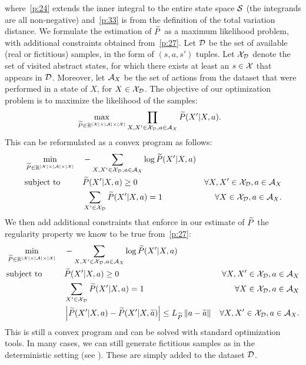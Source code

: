 where~\eqref{p:24} extends the inner integral to the entire state space $\mathcal{S}$ (the integrands are all non-negative) and~\eqref{p:33} is from the definition of the total variation distance.
We formulate the estimation of $\widetilde{P}$ as a maximum likelihood problem, with additional constraints obtained from~\eqref{p:27}.
Let $\mathcal{D}$ be the set of available (real or fictitious) samples, in the form of $(s,a,s')$ tuples. Let $\mathcal{X}_{\mathcal{D}}$ denote the set of visited abstract states, \ie for which there exists at least an $s\in\mathcal{X}$ that appears in $\mathcal{D}$. Moreover, let $\mathcal{A}_{X}$ be the set of actions from the dataset that were performed in a state of $X$, for $X\in\mathcal{X}_{\mathcal{D}}$. 
The objective of our optimization problem is to maximize the likelihood of the samples:
%
\begin{align}
&\max_{\widetilde{P}\in\mathbb{R}^{|\mathcal{X}|\times|\mathcal{A}|\times|\mathcal{X}|}} \prod_{X,X'\in\mathcal{X}_{\mathcal{D}}, a\in\mathcal{A}_{X}}\widetilde{P}(X'|X,a).
\end{align}
%
This can be reformulated as a convex program as follows:
%
\begin{align}
&\min_{\widetilde{P}\in\mathbb{R}^{|\mathcal{X}|\times|\mathcal{A}|\times|\mathcal{X}|}} &&-\sum_{X,X'\in\mathcal{X}_{\mathcal{D}}, a\in\mathcal{A}_{X}}\log\widetilde{P}(X'|X,a) \nonumber\\
&\text{subject to} &&\widetilde{P}(X'|X,a) \geq 0 &\forall X,X'\in\mathcal{X}_{\mathcal{D}}, a\in\mathcal{A}_{X} \nonumber\\
& &&\sum_{X'\in\mathcal{X}_{\mathcal{D}}}\widetilde{P}(X'|X,a) = 1 &\forall X\in\mathcal{X}_{\mathcal{D}}, a\in\mathcal{A}_{X}.
\end{align}
%
We then add additional constraints that enforce in our estimate of $\widetilde{P}$ the regularity property we know to be true from~\eqref{p:27}:
%
\begin{align}
&\min_{\widetilde{P}\in\mathbb{R}^{|\mathcal{X}|\times|\mathcal{A}|\times|\mathcal{X}|}} &&-\sum_{X,X'\in\mathcal{X}_{\mathcal{D}}, a\in\mathcal{A}_{X}}\log\widetilde{P}(X'|X,a) \nonumber\\
&\text{subject to} &&\widetilde{P}(X'|X,a) \geq 0 &\forall X,X'\in\mathcal{X}_{\mathcal{D}}, a\in\mathcal{A}_{X} \nonumber\\
& &&\sum_{X'\in\mathcal{X}_{\mathcal{D}}}\widetilde{P}(X'|X,a) = 1 &\forall X\in\mathcal{X}_{\mathcal{D}}, a\in\mathcal{A}_{X} \nonumber\\
& &&\left|\widetilde{P}(X'|X,a) - \widetilde{P}(X'|X,\widetilde{a})\right| \leq L_{\widetilde{P}}\left\|a- \widetilde{a}\right\|_{} &\forall X,X'\in\mathcal{X}_{\mathcal{D}}, a\in\mathcal{A}_{X}. \label{p:26}
\end{align}
%
This is still a convex program and can be solved with standard optimization tools.
In many cases, we can still generate fictitious samples as in the deterministic setting (see ). These are simply added to the dataset $\mathcal{D}$. 
